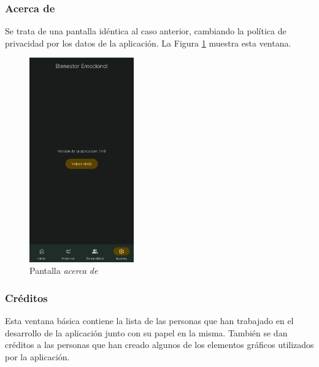                 \clearpage  %
            
                
            \subsubsection*{Acerca de}
                Se trata de una pantalla idéntica al caso anterior, cambiando la política de privacidad por los datos de la aplicación. La Figura \ref{figure:implementacion:pantalla:acerca_de} muestra esta ventana.
                
                \begin{figure}[h]
                	\centering
                	\includegraphics[width=0.4\textwidth]{figures/pantallas/Acerca de.png}
                	\caption{Pantalla \textit{acerca de}}
                	\label{figure:implementacion:pantalla:acerca_de}
                \end{figure}

                \clearpage  %
            \subsubsection*{Créditos}
                Esta ventana básica contiene la lista de las personas que han trabajado en el desarrollo de la aplicación junto con su papel en la misma. También se dan créditos a las personas que han creado algunos de los elementos gráficos utilizados por la aplicación.


